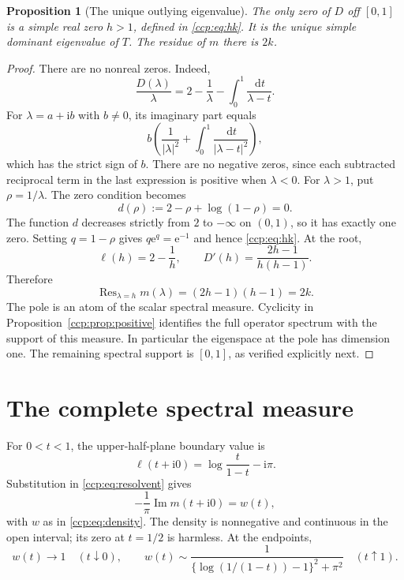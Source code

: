\documentclass[11pt,letterpaper]{article}
\newtheorem{proposition}[theorem]{Proposition}
\theoremstyle{remark}\newtheorem{remark}[theorem]{Remark}
\newcommand{\dd}{\,\mathrm d}
\newcommand{\ii}{\mathrm i}
\newcommand{\im}{\operatorname{Im}}
\newcommand{\ee}{\mathrm e}
\newcommand{\Res}{\operatorname{Res}}
\begin{document}
\begin{proposition}[The unique outlying eigenvalue]\label{ccp:prop:pole}
The only zero of $D$ off $[0,1]$ is a simple real zero $h>1$, defined in \eqref{ccp:eq:hk}. It is the unique simple dominant eigenvalue of $T$. The residue of $m$ there is $2k$.
\end{proposition}
\begin{proof}
There are no nonreal zeros. Indeed,
\[
\frac{D(\lambda)}\lambda=2-\frac1\lambda-\int_0^1\frac{\dd t}{\lambda-t}.
\]
For $\lambda=a+\ii b$ with $b\ne0$, its imaginary part equals
\[
b\left(\frac1{|\lambda|^2}+\int_0^1\frac{\dd t}{|\lambda-t|^2}\right),
\]
which has the strict sign of $b$. There are no negative zeros, since each subtracted reciprocal term in the last expression is positive when $\lambda<0$. For $\lambda>1$, put $\rho=1/\lambda$. The zero condition becomes
\[
d(\rho):=2-\rho+\log(1-\rho)=0.
\]
The function $d$ decreases strictly from $2$ to $-\infty$ on $(0,1)$, so it has exactly one zero. Setting $q=1-\rho$ gives $q\ee^q=\ee^{-1}$ and hence \eqref{ccp:eq:hk}. At the root,
\[
\ell(h)=2-\frac1h,\qquad D'(h)=\frac{2h-1}{h(h-1)}.
\]
Therefore
\[
\Res_{\lambda=h}m(\lambda)=(2h-1)(h-1)=2k.
\]
The pole is an atom of the scalar spectral measure. Cyclicity in Proposition~\ref{ccp:prop:positive} identifies the full operator spectrum with the support of this measure. In particular the eigenspace at the pole has dimension one. The remaining spectral support is $[0,1]$, as verified explicitly next.
\end{proof}

\section{The complete spectral measure}
For $0<t<1$, the upper-half-plane boundary value is
\[
\ell(t+\ii0)=\log\frac t{1-t}-\ii\pi.
\]
Substitution in \eqref{ccp:eq:resolvent} gives
\begin{equation}
-\frac1\pi\im m(t+\ii0)=w(t),\label{ccp:eq:stieltjes}
\end{equation}
with $w$ as in \eqref{ccp:eq:density}. The density is nonnegative and continuous in the open interval; its zero at $t=1/2$ is harmless. At the endpoints,
\[
w(t)\longrightarrow1\quad(t\downarrow0),\qquad
w(t)\sim\frac1{\{\log(1/(1-t))-1\}^2+\pi^2}\quad(t\uparrow1).
\]
\end{document}
